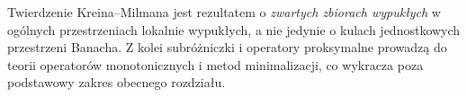 \begin{uwaga}
Twierdzenie Kreina--Milmana jest rezultatem o \emph{zwartych
zbiorach wypukłych} w ogólnych przestrzeniach lokalnie wypukłych,
a nie jedynie o kulach jednostkowych przestrzeni Banacha.
Z kolei subróżniczki i operatory proksymalne prowadzą
do teorii operatorów monotonicznych i metod minimalizacji,
co wykracza poza podstawowy zakres obecnego rozdziału.
\end{uwaga}
